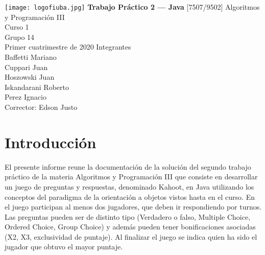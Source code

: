 \documentclass[titlepage,a4paper]{article}
\begin{document}
\begin{titlepage} %
	\hfill\texttt{[image: logofiuba.jpg]}
    \centering
    \vfill
    \Huge \textbf{Trabajo Práctico 2 — Java}
    \vskip2cm
    \Large [7507/9502] Algoritmos y Programación III\\
    Curso 1 \\ %
    Grupo 14 \\
    Primer cuatrimestre de 2020
    \vfill
    Integrantes\\[1\baselineskip]

    Baffetti Mariano\\
    Cuppari Juan\\
    Hoszowski Juan\\
    Iskandarani Roberto\\
    Perez Ignacio\\
    \vfill
    Corrector: Edson Justo
    \vfill
\end{titlepage}

\tableofcontents %
\newpage

\section{Introducción}\label{sec:intro}
El presente informe reune la documentación de la solución del segundo trabajo práctico de la materia Algoritmos y Programación III que consiste en desarrollar un juego de preguntas y respuestas, denominado Kahoot, en Java utilizando los conceptos del paradigma de la orientación a objetos vistos hasta en el curso. En el juego participan al menos dos jugadores, que deben ir respondiendo por turnos. Las preguntas pueden ser de distinto tipo (Verdadero o falso, Multiple Choice, Ordered Choice, Group Choice) y además pueden tener bonificaciones asociadas (X2, X3, exclusividad de puntaje). Al finalizar el juego se indica quien ha sido el jugador que obtuvo el mayor puntaje.
\end{document}
